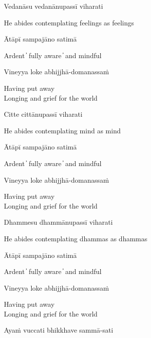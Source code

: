 Vedanāsu vedanānupassī viharati

\begin{cprenglish}
He abides contemplating feelings as feelings
\end{cprenglish}

Ātāpī sampajāno satimā

\begin{cprenglish}
Ardent  ̓  fully aware  ̓  and mindful
\end{cprenglish}

Vineyya loke abhijjhā-domanassaṁ

\begin{cprenglish}
Having put away\\
Longing and grief for the world
\end{cprenglish}

Citte cittānupassī viharati

\begin{cprenglish}
He abides contemplating mind as mind
\end{cprenglish}

Ātāpī sampajāno satimā

\begin{cprenglish}
Ardent  ̓  fully aware  ̓  and mindful
\end{cprenglish}

Vineyya loke abhijjhā-domanassaṁ

\begin{cprenglish}
Having put away\\
Longing and grief for the world
\end{cprenglish}

Dhammesu dhammānupassī viharati

\begin{cprenglish}
He abides contemplating dhammas as dhammas
\end{cprenglish}

Ātāpī sampajāno satimā

\begin{cprenglish}
Ardent  ̓  fully aware  ̓  and mindful
\end{cprenglish}

Vineyya loke abhijjhā-domanassaṁ

\begin{cprenglish}
Having put away\\
Longing and grief for the world
\end{cprenglish}

Ayaṁ vuccati bhikkhave sammā-sati

